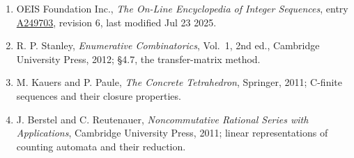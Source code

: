 \documentclass[11pt]{article}
\theoremstyle{definition}
\begin{document}
\begin{enumerate}

\item OEIS Foundation Inc., \emph{The On-Line Encyclopedia of Integer Sequences}, entry \href{https://oeis.org/A249703}{A249703}, revision 6, last modified Jul 23 2025.

\item R. P. Stanley, \emph{Enumerative Combinatorics}, Vol.~1, 2nd ed., Cambridge University Press, 2012; \S4.7, the transfer-matrix method.

\item M. Kauers and P. Paule, \emph{The Concrete Tetrahedron}, Springer, 2011; C-finite sequences and their closure properties.

\item J. Berstel and C. Reutenauer, \emph{Noncommutative Rational Series with Applications}, Cambridge University Press, 2011; linear representations of counting automata and their reduction.

\end{enumerate}
\end{document}
